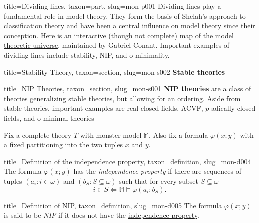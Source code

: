 \documentclass[a4paper]{article}
\begin{document}
  
  
\begin{tree}{title={Dividing lines}, taxon={part}, slug={mon-p001}}
Dividing lines play a fundamental role in model theory. They form the basis of Shelah's approach to classification theory and have been a central influence on model theory since their conception. Here is an interactive (though not complete) map of the \href{https://forkinganddividing.com}{model theoretic universe}, maintained by Gabriel Conant. Important examples of dividing lines include stability, NIP, and o-minimality.
  
  
\begin{tree}{title={Stability Theory}, taxon={section}, slug={mon-s002}}
\textbf{Stable theories}
\end{tree}


    
    
\begin{tree}{title={NIP Theories}, taxon={section}, slug={mon-s001}}
\textbf{NIP theories} are a class of theories generalizing stable
theories, but allowing for an ordering. Aside from stable theories,
important examples are real closed fields, ACVF, \(p\)-adically closed
fields, and o-minimal theories\par{Fix a complete theory \(T\) with monster model \(\mathbb {M}\).
Also fix a formula \(\varphi (x;y)\) with a fixed partitioning into
the two tuples \(x\) and \(y\).}
\begin{tree}{title={Definition of the independence property}, taxon={definition}, slug={mon-d004}}
The formula \(\varphi (x;y)\) has the \emph{independence property} if there
are sequences of tuples \((a_i : i  \in   \omega )\) and
\((b_S : S  \subseteq   \omega )\) such that for every subset \(S  \subseteq   \omega\)
\[i  \in  S  \Longleftrightarrow   \mathbb {M}  \models   \varphi (a_i; b_S).\]
\end{tree}

\begin{tree}{title={Definition of NIP}, taxon={definition}, slug={mon-d005}}
The formula \(\varphi (x;y)\) is said to be \emph{NIP} if it does not have
the \href{mon-0004}{independence property}.
\end{tree}


\end{tree}
\end{tree}
\end{document}

